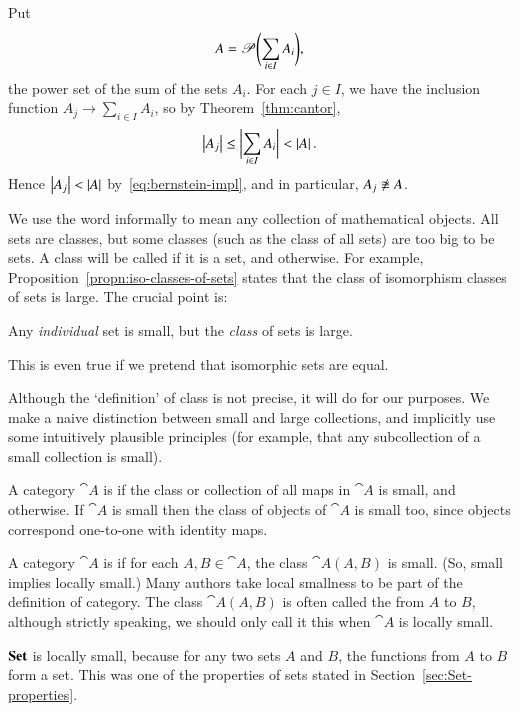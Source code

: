 \begin{pf}
Put
\[
A = \operatorname{\mathscr{P}}\Biggl(\sum_{i \in I} A_i\Biggr),
\]
the power set of the sum of the sets $A_i$.  For each $j \in I$, we have
the inclusion function $A_j \to \sum_{i \in I} A_i$, so by
Theorem~\ref{thm:cantor},
\[
\left|A_j\right| \leq \biggl| \sum_{i \in I} A_i \biggr| < \left|A\right|.
\]
Hence $\left|A_j\right| < \left|A\right|$ by~\eqref{eq:bernstein-impl}, and in particular,
$A_j \not\iso A$.
\end{pf}
%
%

We use the word %
%
%
informally to mean any collection of mathematical objects.  All sets are
classes, but some classes (such as the class of all sets) are too big to be
sets.  A class will be called %
%
%
if it is a set, and %
%
%
otherwise.  For example, Proposition~\ref{propn:iso-classes-of-sets} states
that the class of isomorphism classes of sets is large.  The crucial point
is:
% 
\begin{slogan}
Any \emph{individual} set is small, but the \emph{class} of sets is
large.
\end{slogan}
% 
This is even true if we pretend that isomorphic sets are equal.

Although the `definition' of class is not precise, it will do for our
purposes.  We make a naive distinction between small and large collections,
and implicitly use some intuitively plausible principles (for example, that
any subcollection of a small collection is small).

A category $\cat{A}$ is %
%
%
%
if the class or collection of all maps in $\cat{A}$ is small, and
%
%
%
%
otherwise.  If $\cat{A}$ is small then the class of objects of $\cat{A}$ is
small too, since objects correspond one-to-one with identity maps.

A category $\cat{A}$ is %
%
%
%
if for each $A, B \in \cat{A}$, the class $\cat{A}(A, B)$ is small.  (So,
small implies locally small.)  Many authors take local smallness to be part
of the definition of category.  The class $\cat{A}(A, B)$ is often called
the %
%
%
from $A$ to $B$, although strictly speaking, we should only call it this
when $\cat{A}$ is locally small.

\begin{example}
%
%
$\mathbf{Set}$ is locally small, because for any two sets $A$ and $B$, the
functions from $A$ to $B$ form a set.  This was one of the properties of
sets stated in Section~\ref{sec:Set-properties}.
\end{example}

